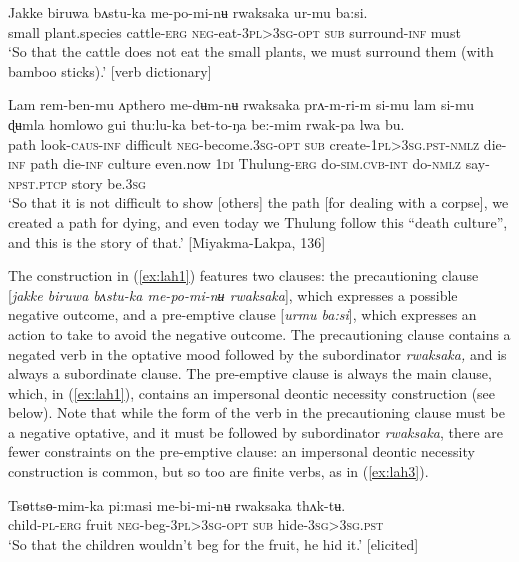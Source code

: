 \documentclass[output=paper,colorlinks,citecolor=brown,
]{langscibook}
\begin{document}
\ea \label{ex:lah1}
\gll Jakke biruwa bʌstu-ka me-po-mi-nʉ rwaksaka ur-mu ba:si. \\
small plant.species cattle-\textsc{erg} \textsc{neg}-eat-\textsc{3pl>3sg-opt} \textsc{sub} surround-\textsc{inf} must \\
\glt `So that the cattle does not eat the small plants, we must surround them (with bamboo sticks).' [verb dictionary]
\z


\ea \label{ex:lah2}
\gll Lam rem-ben-mu ʌpthero me-dʉm-nʉ rwaksaka prʌ-m-ri-m si-mu lam si-mu ɖʉmla homlowo gui thu:lu-ka bet-to-ŋa be:-mim rwak-pa lwa bu. \\
path look-\textsc{caus-inf} difficult \textsc{neg}-become.\textsc{3sg-opt} \textsc{sub} create-\textsc{1pl>3sg.pst-nmlz} die-\textsc{inf} path die-\textsc{inf} culture even.now \textsc{1di} Thulung-\textsc{erg} do-\textsc{sim.cvb-int} do-\textsc{nmlz} say-\textsc{npst.ptcp} story be.\textsc{3sg} \\
\glt `So that it is not difficult to show [others] the path [for dealing with a corpse], we created a path for dying, and even today we Thulung follow this ``death culture'', and this is the story of that.' [Miyakma-Lakpa, 136]
\z

The construction in (\ref{ex:lah1}) features two clauses: the precautioning clause [\textit{jakke biruwa bʌstu-ka me-po-mi-nʉ rwaksaka}], which expresses a possible negative outcome, and a pre-emptive clause [\textit{urmu ba:si}], which expresses an action to take to avoid the negative outcome. The precautioning clause contains a negated verb in the optative mood followed by the subordinator \textit{rwaksaka,} and is always a subordinate clause. The pre-emptive clause is always the main clause, which, in (\ref{ex:lah1}), contains an impersonal deontic necessity construction (see  below). Note that while the form of the verb in the precautioning clause must be a negative optative, and it must be followed by subordinator \textit{rwaksaka}, there are fewer constraints on the pre-emptive clause: an impersonal deontic necessity construction is common, but so too are finite verbs, as in (\ref{ex:lah3}). 

\ea \label{ex:lah3}
\gll Tsɵttsɵ-mim-ka pi:masi me-bi-mi-nʉ rwaksaka thʌk-tʉ. \\
child-\textsc{pl-erg} fruit \textsc{neg}-beg-\textsc{3pl>3sg-opt} \textsc{sub} hide-\textsc{3sg>3sg.pst} \\
\glt `So that the children wouldn't beg for the fruit, he hid it.' [elicited]
\z
\end{document}

